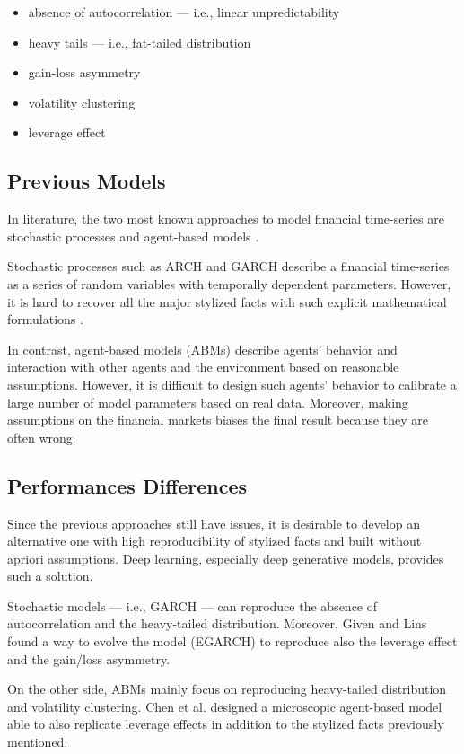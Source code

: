 \documentclass[runningheads]{llncs}
\begin{document}
\begin{itemize}
  \item absence of autocorrelation — i.e., linear unpredictability
  \item heavy tails — i.e., fat-tailed distribution
  \item gain-loss asymmetry
  \item volatility clustering
  \item leverage effect
\end{itemize}

\subsection{Previous Models} \label{models}
In literature, the two most known approaches to model financial time-series are stochastic processes \cite{engle_1982,bollerslev_1986} and agent-based models \cite{holland_1991}. 

Stochastic processes such as ARCH and GARCH describe a financial time-series as a series of random variables with temporally dependent parameters. However, it is hard to recover all the major stylized facts with such explicit mathematical formulations \cite{malmsten_2010}. 

In contrast, agent-based models (ABMs) describe agents’ behavior and interaction with other agents and the environment based on reasonable assumptions. However, it is diﬃcult to design such agents’ behavior to calibrate a large number of model parameters based on real data. Moreover, making assumptions on the financial markets biases the final result because they are often wrong.

\subsection{Performances Differences}\label{diff}
Since the previous approaches still have issues, it is desirable to develop an alternative one with high reproducibility of stylized facts and built without apriori assumptions. Deep learning, especially deep generative models, provides such a solution.

Stochastic models — i.e., GARCH — can reproduce the absence of autocorrelation and the heavy-tailed distribution. Moreover, Given and Lins \cite{siven_2009} found a way to evolve the model (EGARCH) to reproduce also the leverage effect and the gain/loss asymmetry.

On the other side, ABMs mainly focus on reproducing heavy-tailed distribution and volatility clustering. Chen et al. \cite{chen_2013} designed a microscopic agent-based model able to also replicate leverage effects in addition to the stylized facts previously mentioned.
\end{document}
